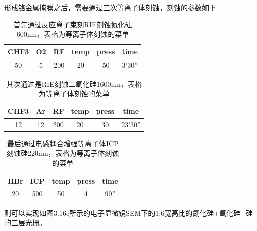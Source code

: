形成铬金属掩膜之后，需要通过三次等离子体刻蚀，刻蚀的参数如下

\begin{table}[!htbp]
    \caption{首先通过反应离子束刻RIE刻蚀氮化硅600nm，表格为等离子体刻蚀的菜单}
    \label{tab:3}
    \centering
    \footnotesize%
    \setlength{\tabcolsep}{4pt}%
    \renewcommand{\arraystretch}{1.2}%
\begin{tabular}{|c|c|c|c|c|c|}
\hline
CHF3 & O2 & RF  & temp & press & time   \\ \hline
50   & 5  & 200 & 20   & 50    & 3'30'' \\ \hline
\end{tabular}
\end{table}

\begin{table}[!htbp]
    \caption{其次通过是RIE刻蚀二氧化硅1600nm，表格为等离子体刻蚀的菜单}
    \label{tab:4}
    \centering
    \footnotesize%
    \setlength{\tabcolsep}{4pt}%
    \renewcommand{\arraystretch}{1.2}%
\begin{tabular}{|c|c|c|c|c|c|}
\hline
CHF3 & Ar & RF  & temp & press & time    \\ \hline
12   & 12 & 200 & 20   & 30    & 23'30'' \\ \hline
\end{tabular}
\end{table}

\begin{table}[!htbp]
    \caption{最后通过电感耦合增强等离子体ICP刻蚀硅220nm，表格为等离子体刻蚀的菜单}
    \label{tab:5}
    \centering
    \footnotesize%
    \setlength{\tabcolsep}{4pt}%
    \renewcommand{\arraystretch}{1.2}%
\begin{tabular}{|c|c|c|c|c|}
\hline
HBr & ICP & temp & press & time \\ \hline
20  & 500 & 50   & 4     & 90'' \\ \hline
\end{tabular}
\end{table}
则可以实现如图3.16c所示的电子显微镜SEM下的1:6宽高比的氮化硅+氧化硅+硅的三层光栅。


